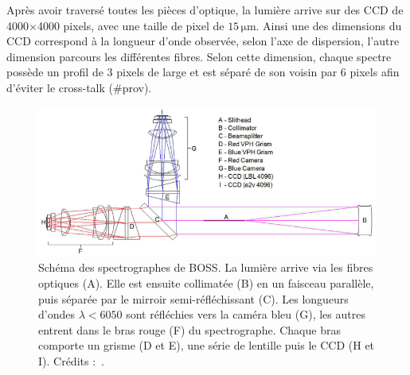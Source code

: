 \documentclass[11pt, twoside, a4paper, openright]{report}
\begin{document}
Après avoir traversé toutes les pièces d'optique, la lumière arrive sur des CCD de \num{4000}$\times$\num{4000} pixels, avec une taille de pixel de $15\,\mathrm{\mu m}$. Ainsi une des dimensions du CCD correspond à la longueur d'onde observée, selon l'axe de dispersion, l'autre dimension parcours les différentes fibres. Selon cette dimension, chaque spectre possède un profil de 3 pixels de large et  est séparé de son voisin par 6 pixels afin d'éviter le cross-talk (\#prov).
\begin{figure}
  \centering
  \includegraphics[scale=0.5]{../img/eBOSS/SchemaSpectro}
  \caption{Schéma des spectrographes de BOSS. La lumière arrive via les fibres optiques (A). Elle est ensuite collimatée (B) en un faisceau parallèle, puis séparée par le mirroir semi-réfléchissant (C). Les longueurs d'ondes $\lambda < \num{6050}$ sont réfléchies vers la caméra bleu (G), les autres entrent dans le bras rouge (F) du spectrographe. Chaque bras comporte un grisme (D et E), une série de lentille puis le CCD (H et I). Crédits :~\cite{Smee2012}.}
  \label{fig:SchemaSpectro}
\end{figure}
\end{document}

